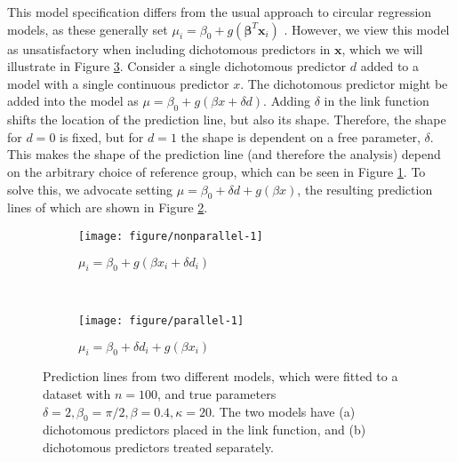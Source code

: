 \documentclass[11pt,a4paper]{article}\usepackage[]{graphicx}\usepackage[]{color}
\makeatletter
\def\maxwidth{ %
  \ifdim\Gin@nat@width>\linewidth
    \linewidth
  \else
    \Gin@nat@width
  \fi
}
\newenvironment{knitrout}{}{} %
\newcommand{\bx}{\boldsymbol{x}}
\newcommand{\bbt}{\boldsymbol{\beta}}
\makeatother
\begin{document}
This model specification differs from the usual approach to circular regression models, as these generally set \( \mu_i = \beta_0 + g(\bbt^T \bx_i)\) \citep{fisher1992regression, gill2010, lagona2015regression}. However, we view this model as unsatisfactory when including dichotomous predictors in \( \bx \), which we will illustrate in Figure \ref{parallelnonparallel}. Consider a single dichotomous predictor \( d \) added to a model with a single continuous predictor \( x \). The dichotomous predictor might be added into the model as \( \mu = \beta_0 + g(\beta x + \delta d ) \). Adding \( \delta \) in the link function shifts the location of the prediction line, but also its shape. Therefore, the shape for \( d = 0 \) is fixed, but for \( d = 1 \) the shape is dependent on a free parameter, \( \delta \). This makes the shape of the prediction line (and therefore the analysis) depend on the arbitrary choice of reference group, which can be seen in Figure \ref{nonparallel}. To solve this, we advocate setting \( \mu = \beta_0 + \delta d + g(\beta x ) \), the resulting prediction lines of which are shown in Figure \ref{parallel}.

\begin{figure}

\begin{subfigure}[b]{0.5\textwidth}



\begin{knitrout}
\color{fgcolor}
\texttt{[image: figure/nonparallel-1]} 

\end{knitrout}
\caption{$\mu_i = \beta_0 + g(\beta x_i  + \delta d_i)$}
\label{nonparallel}
\end{subfigure}
~
\begin{subfigure}[b]{0.5\textwidth}
\begin{knitrout}
\color{fgcolor}
\texttt{[image: figure/parallel-1]} 

\end{knitrout}
\caption{$\mu_i = \beta_0  + \delta d_i + g(\beta x_i)$}
\label{parallel}
\end{subfigure}

\caption{Prediction lines from two different models, which were fitted to a dataset with $n = 100$, and true parameters $\delta = 2, \beta_0 = \pi/2, \beta = 0.4, \kappa = 20$. The two models have (a) dichotomous predictors placed in the link function, and (b) dichotomous predictors treated separately.}
\label{parallelnonparallel}
\end{figure}
\end{document}
